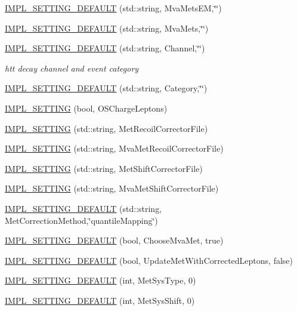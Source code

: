 \begin{DoxyCompactItemize}
\item 
\hyperlink{classHttSettings_a73b5e6629b9a83be1f201ade3a53cb4a}{IMPL\_\-SETTING\_\-DEFAULT} (std::string, MvaMetsEM,\char`\"{}\char`\"{})
\item 
\hyperlink{classHttSettings_a9efcc755d91c4adf0eaee0c3c5caa413}{IMPL\_\-SETTING\_\-DEFAULT} (std::string, MvaMets,\char`\"{}\char`\"{})
\item 
\hyperlink{classHttSettings_ad95fcd09e68f5825da98b58adf7e868f}{IMPL\_\-SETTING\_\-DEFAULT} (std::string, Channel,\char`\"{}\char`\"{})
\begin{DoxyCompactList}\small\item\em htt decay channel and event category \item\end{DoxyCompactList}\item 
\hyperlink{classHttSettings_abe7e0c6ca1d63a2ad87bd40567eccd61}{IMPL\_\-SETTING\_\-DEFAULT} (std::string, Category,\char`\"{}\char`\"{})
\item 
\hyperlink{classHttSettings_a36256b0f0115e6efd8cb86bb8a0a6b13}{IMPL\_\-SETTING} (bool, OSChargeLeptons)
\item 
\hyperlink{classHttSettings_a7702319e39e58d88570bb84ea577f208}{IMPL\_\-SETTING} (std::string, MetRecoilCorrectorFile)
\item 
\hyperlink{classHttSettings_a7523bd5520bf59a485cb19c11f6e902e}{IMPL\_\-SETTING} (std::string, MvaMetRecoilCorrectorFile)
\item 
\hyperlink{classHttSettings_a8cd0a1343cd2ae2b2e68fd148e41e59b}{IMPL\_\-SETTING} (std::string, MetShiftCorrectorFile)
\item 
\hyperlink{classHttSettings_a1e48c177204aca674b7a2cc958b0990e}{IMPL\_\-SETTING} (std::string, MvaMetShiftCorrectorFile)
\item 
\hyperlink{classHttSettings_a712769a2f44e79f09a2810f9bb3556f2}{IMPL\_\-SETTING\_\-DEFAULT} (std::string, MetCorrectionMethod,\char`\"{}quantileMapping\char`\"{})
\item 
\hyperlink{classHttSettings_a69b5087e83cd55eb36de66134b3622d5}{IMPL\_\-SETTING\_\-DEFAULT} (bool, ChooseMvaMet, true)
\item 
\hyperlink{classHttSettings_a3dc8d9cd8094adc68ce060e2a0202360}{IMPL\_\-SETTING\_\-DEFAULT} (bool, UpdateMetWithCorrectedLeptons, false)
\item 
\hyperlink{classHttSettings_a128ab2e519a985d51e811cf99e197646}{IMPL\_\-SETTING\_\-DEFAULT} (int, MetSysType, 0)
\item 
\hyperlink{classHttSettings_a7e782c3ef47b58bd6771789bf644e957}{IMPL\_\-SETTING\_\-DEFAULT} (int, MetSysShift, 0)

\end{DoxyCompactItemize}
